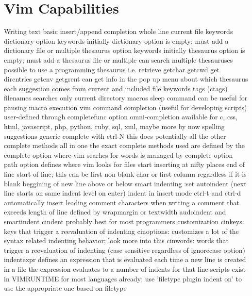 \documentclass[12pt]{book}
\begin{document}
\section{Vim Capabilities}
Writing text
  basic insert/append
  completion
    whole line
    current file keywords
    dictionary option keywords
      initially dictionary option is empty; must add a dictionary file or multiple
    thesaurus option keywords
      initially thesaurus option is empty; must add a thesaurus file or multiple
      can search multiple thesauruses
      possible to use a programming thesaurus i.e. retrieve getchar getcwd get direntries getenv getgrent
      can get info in the pop up menu about which thesaurus each suggestion comes from
    current and included file keywords
    tags (ctags)
    filenames
      searches only current directory
    macros
      sleep command can be useful for pausing macro execution
    vim command completion (useful for developing scripts)
    user-defined through completefunc option
    omni-completion
      available for c, css, html, javascript, php, python, ruby, sql, xml, maybe more by now
    spelling suggestions
    generic complete with ctrl-N
      this does potentially all the other complete methods all in one
      the exact complete methods used are defined by the complete option
    where vim searhes for words is managed by complete option
    path option defines where vim looks for files
  start inserting at nifty places
    end of line
    start of line; this can be first non blank char or first column regardless if it is blank
    beggining of new line above or below
    smart indenting
      :set autoindent (next line starts on same indent level on enter)
      indent in insert mode ctrl-t and ctrl-d
      automatically insert leading comment characters when writing a comment that exceeds length of line defined by wrapmargin or textwidth
      audoindent and smartindent
      cindent
        probably best for most programmers
        customization
          cinkeys: keys that trigger a reevaluation of indenting
          cinoptions: customizes a lot of the syntax related indenting behavior; look more into this
          cinwords: words that trigger a reevaluation of indenting (case sensitive regardless of ignorecase option)
      indentexpr
        defines an expression that is evaluated each time a new line is created in a file
        the expression evaluates to a number of indents for that line
        scripts exist in VIMRUNTIME for most languages already; use 'filetype plugin indent on' to use the appropriate one based on filetype
\end{document}
